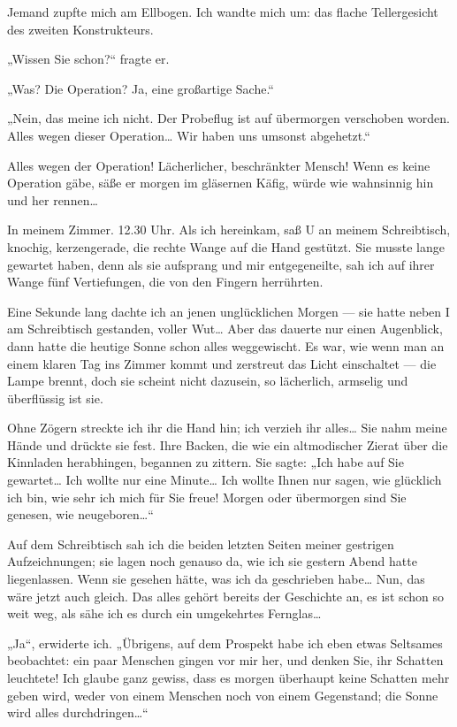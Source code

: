 Jemand zupfte mich am Ellbogen. Ich wandte mich um: das flache
Tellergesicht des zweiten Konstrukteurs.

„Wissen Sie schon?“ fragte er.

„Was? Die Operation? Ja, eine großartige Sache.“

„Nein, das
meine ich nicht. Der Probeflug ist auf übermorgen verschoben
worden. Alles wegen dieser Operation\ldots{} Wir haben uns umsonst
abgehetzt.“

Alles wegen der Operation! Lächerlicher, beschränkter Mensch! Wenn
es keine Operation gäbe, säße er morgen im gläsernen Käfig, würde
wie wahnsinnig hin und her rennen\ldots{}

In meinem Zimmer. 12.30 Uhr. Als ich hereinkam, saß U an meinem
Schreibtisch, knochig, kerzengerade, die rechte Wange auf die Hand
gestützt. Sie musste lange gewartet haben, denn als sie aufsprang
und mir entgegeneilte, sah ich auf ihrer Wange fünf Vertiefungen,
die von den Fingern herrührten.

Eine Sekunde lang dachte ich an jenen unglücklichen Morgen — sie
hatte neben I am Schreibtisch gestanden, voller Wut\ldots{} Aber das
dauerte nur einen Augenblick, dann hatte die heutige Sonne schon
alles weggewischt. Es war, wie wenn man an einem klaren Tag ins
Zimmer kommt und zerstreut das Licht einschaltet — die Lampe
brennt, doch sie scheint nicht dazusein, so lächerlich, armselig
und überflüssig ist sie.

Ohne Zögern streckte ich ihr die Hand hin; ich verzieh ihr alles\ldots{}
Sie nahm meine Hände und drückte sie fest. Ihre Backen, die wie ein
altmodischer Zierat über die Kinnladen herabhingen, begannen zu
zittern. Sie sagte: „Ich habe auf Sie gewartet\ldots{} Ich wollte nur
eine Minute\ldots{} Ich wollte Ihnen nur sagen, wie glücklich ich bin,
wie sehr ich mich für Sie freue! Morgen oder übermorgen sind Sie
genesen, wie neugeboren\ldots{}“

Auf dem Schreibtisch sah ich die
beiden letzten Seiten meiner gestrigen Aufzeichnungen; sie lagen
noch genauso da, wie ich sie gestern Abend hatte liegenlassen. Wenn
sie gesehen hätte, was ich da geschrieben habe\ldots{} Nun, das wäre
jetzt auch gleich. Das alles gehört bereits der Geschichte an, es
ist schon so weit weg, als sähe ich es durch ein umgekehrtes
Fernglas\ldots{}

„Ja“, erwiderte ich. „Übrigens, auf dem Prospekt habe ich eben
etwas Seltsames beobachtet: ein paar Menschen gingen vor mir her,
und denken Sie, ihr Schatten leuchtete! Ich glaube ganz gewiss,
dass es morgen überhaupt keine Schatten mehr geben wird, weder von
einem Menschen noch von einem Gegenstand; die Sonne wird alles
durchdringen\ldots{}“

